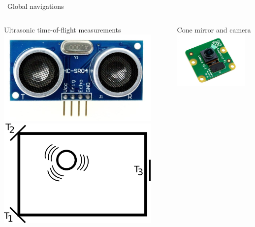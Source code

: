 \documentclass{beamer}
\begin{document}
\begin{frame}{\quad \quad ~Global navigations}
\begin{columns}
\begin{column}{0.49\textwidth}
\centering
Ultrasonic time-of-flight measurements
\newline{}
\includegraphics[width = 0.9\textwidth]{Pictures/ultrasonic}
\newline{}
\includegraphics[width = 0.9\textwidth]{Pictures/ultrascheme}
\end{column}
\begin{column}{0.49\textwidth}
\centering
Cone mirror and camera
\newline{}
\includegraphics[width = 0.9\textwidth]{Pictures/rpicamera}

\end{column}
\end{columns}
\end{frame}
\end{document}
